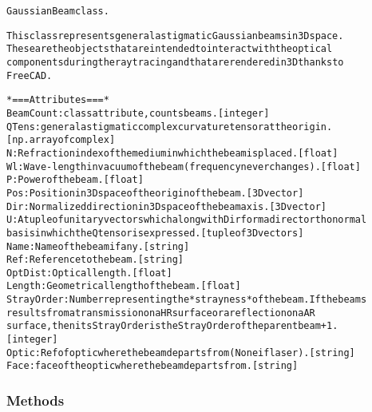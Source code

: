 \begin{alltt}


GaussianBeam class.

This class represents general astigmatic Gaussian beams in 3D space.
These are the objects that are intended to interact with the optical
components during the ray tracing and that are rendered in 3D thanks to
FreeCAD.

*=== Attributes ===*
BeamCount: class attribute, counts beams. [integer]
QTens: general astigmatic complex curvature tensor at the origin.
    [np. array of complex]
N: Refraction index of the medium in which the beam is placed. [float]
Wl: Wave-length in vacuum of the beam (frequency never changes). [float]
P: Power of the beam. [float]
Pos: Position in 3D space of the origin of the beam. [3D vector]
Dir: Normalized direction in 3D space of the beam axis. [3D vector]
U: A tuple of unitary vectors which along with Dir form a direct orthonormal
    basis in which the Q tensor is expressed. [tuple of 3D vectors]
Name: Name of the beam if any. [string]
Ref: Reference to the beam. [string]
OptDist: Optical length. [float]
Length: Geometrical length of the beam. [float]
StrayOrder: Number representing the *strayness* of the beam. If the beams
    results from a transmission on a HR surface or a reflection on a AR
    surface, then its StrayOrder is the StrayOrder of the parent beam + 1.
    [integer]
Optic: Ref of optic where the beam departs from (None if laser). [string]
Face: face of the optic where the beam departs from. [string]
\end{alltt}



  \subsubsection{Methods}

    \vspace{0.5ex}

